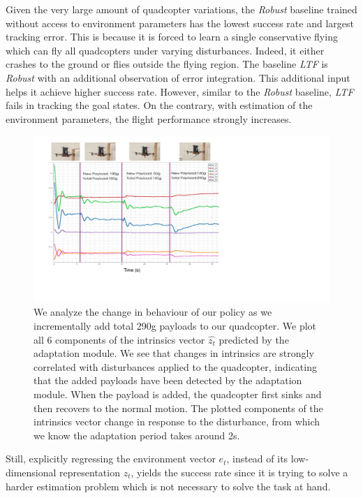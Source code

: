 Given the very large amount of quadcopter variations, the \emph{Robust} baseline trained without access to environment parameters has the lowest success rate and largest tracking error. This is because it is forced to learn a single conservative flying which can fly all quadcopters under varying disturbances.
%
Indeed, it either crashes to the ground or flies outside the flying region.
%
The baseline \emph{LTF} is \emph{Robust} with an additional observation of error integration. This additional input helps it achieve higher success rate. However, similar to the \emph{Robust} baseline, \emph{LTF} fails in tracking the goal states. 
%
On the contrary, with estimation of the environment parameters, the flight performance strongly increases.
%
\begin{figure}[t]
    \centering
    \includegraphics[width=\columnwidth]{img/extrinsics_plot_timescale.pdf}
    \caption{\small We analyze the change in behaviour of our policy as we incrementally add total 290g payloads to our quadcopter. We plot all 6 components of the intrinsics vector $\hat{z_t}$ predicted by the adaptation module. We see that changes in intrinsics are strongly correlated with disturbances applied to the quadcopter, indicating that the added payloads have been detected by the adaptation module. When the payload is added, the quadcopter first sinks and then recovers to the normal motion. The plotted components of the intrinsics vector change in response to the disturbance, from which we know the adaptation period takes around 2s.}
    \label{fig:intrinsics_analysis}
\end{figure}
%
Still, explicitly regressing the environment vector $e_t$, instead of its low-dimensional representation $z_t$, yields the success rate since it is trying to solve a harder estimation problem which is not necessary to solve the task at hand.
